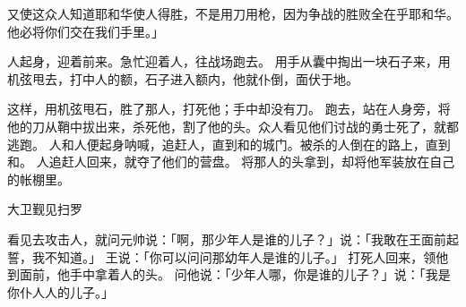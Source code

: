 {又使这众人知道耶和华使人得胜，不是用刀用枪，因为争战的胜败全在乎耶和华。他必将你们交在我们手里。」
\par }{\PP {}人起身，迎着{}前来。{}急忙迎着{}人，往战场跑去。
用手从囊中掏出一块石子来，用机弦甩去，打中{}人的额，石子进入额内，他就仆倒，面伏于地。
\par }{\PP {}这样，{}用机弦甩石，胜了那{}人，打死他；{}手中却没有刀。
跑去，站在{}人身旁，将他的刀从鞘中拔出来，杀死他，割了他的头。{}众人看见他们讨战的勇士死了，就都逃跑。
人和{}人便起身呐喊，追赶{}人，直到{}和{}的城门。被杀的{}人倒在{}的路上，直到{}和{}。
人追赶{}人回来，就夺了他们的营盘。
将那{}人的头拿到{}，却将他军装放在自己的帐棚里。
\par }{\SH 大卫觐见扫罗
\par }{\PP {}看见{}去攻击{}人，就问元帅{}说：「{}啊，那少年人是谁的儿子？」{}说：「我敢在王面前起誓，我不知道。」
王说：「你可以问问那幼年人是谁的儿子。」
打死{}人回来，{}领他到{}面前，他手中拿着{}人的头。
问他说：「少年人哪，你是谁的儿子？」{}说：「我是你仆人{}人{}的儿子。」

}
